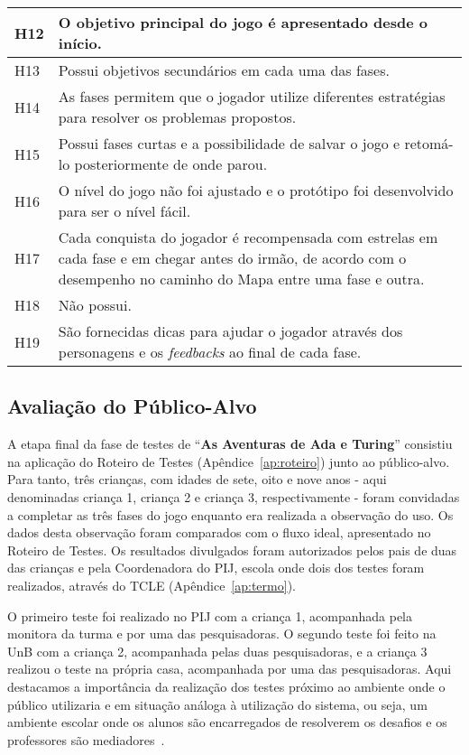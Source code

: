 \begin{table}[H]
\begin{tabular}{|l|p{15.5cm}|}
H12 & O objetivo principal do jogo é apresentado desde o início. \\ \hline
H13 & Possui objetivos secundários em cada uma das fases.  \\ \hline
H14 & As fases permitem que o jogador utilize diferentes estratégias para resolver os problemas propostos.  \\ \hline
H15 & Possui fases curtas e a possibilidade de salvar o jogo e retomá-lo posteriormente de onde parou. \\ \hline
H16 & O nível do jogo não foi ajustado e o protótipo foi desenvolvido para ser o nível fácil.   \\ \hline
H17 & Cada conquista do jogador é recompensada com estrelas em cada fase e em chegar antes do irmão, de acordo com o desempenho no caminho do Mapa entre uma fase e outra. \\ \hline
H18 & Não possui. \\ \hline
H19 & São fornecidas dicas para ajudar o jogador através dos personagens e os \textit{feedbacks} ao final de cada fase. \\ \hline
\end{tabular}
\end{table}

\subsection{Avaliação do Público-Alvo} \label{ssec:publico-alvo}

A etapa final da fase de testes de “\textbf{As Aventuras de Ada e Turing}” consistiu na aplicação do Roteiro de Testes (Apêndice~\ref{ap:roteiro}) junto ao público-alvo. Para tanto, três crianças, com idades de sete, oito e nove anos - aqui denominadas criança 1, criança 2 e criança 3, respectivamente - foram convidadas a completar as três fases do jogo enquanto era realizada a observação do uso. Os dados desta observação foram comparados com o fluxo ideal, apresentado no Roteiro de Testes. Os resultados divulgados foram autorizados pelos pais de duas das crianças e pela Coordenadora do \acrfull{PIJ}, escola onde dois dos testes foram realizados, através do \acrshort{TCLE} (Apêndice~\ref{ap:termo}). 

O primeiro teste foi realizado no \acrshort{PIJ} com a criança 1, acompanhada pela monitora da turma e por uma das pesquisadoras. O segundo teste foi feito na \acrshort{UnB} com a criança 2, acompanhada pelas duas pesquisadoras, e a criança 3 realizou o teste na própria casa, acompanhada por uma das pesquisadoras. Aqui destacamos a importância da realização dos testes próximo ao ambiente onde o público utilizaria e em situação análoga à utilização do sistema, ou seja, um ambiente escolar onde os alunos são encarregados de resolverem os desafios e os professores são mediadores~\cite{silva_pensamento_2016}.


